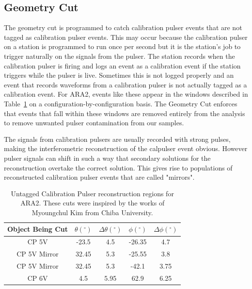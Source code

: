   \subsection{Geometry Cut}
  
    The geometry cut is programmed to catch calibration pulser events that are not tagged as calibration pulser events. 
    This may occur because the calibration pulser on a station is programmed to run once per second but it is the station's job to trigger naturally on the signals from the pulser. %
    The station records when the calibration pulser is firing and logs an event as a calibration event if the station triggers while the pulser is live. 
    Sometimes this is not logged properly and an event that records waveforms from a calibration pulser is not actually tagged as a calibration event. 
    For ARA2, events like these appear in the windows described in Table~\ref{tab:A2GC} on a configuration-by-configuration basis.
    The Geometry Cut enforces that events that fall within these windows are removed entirely from the analysis to remove unwanted pulser contamination from our samples.  
    
    The signals from calibration pulsers are usually recorded with strong pulses, making the interferometric reconstruction of the calpulser event obvious. 
    However pulser signals can shift in such a way that secondary solutions for the reconstruction overtake the correct solution. 
    This gives rise to populations of reconstructed calibration pulser events that are called "mirrors". 
    
    \begin{table}
      \centering
      \begin{tabular}{ | c | c c | c c |}
        \hline
        Object Being Cut & $\theta (^{\circ})$ & $\Delta\theta (^{\circ})$ & $\phi (^{\circ})$ & $\Delta\phi (^{\circ})$ \\
        \hline
        CP 5V & -23.5 & 4.5 & -26.35 & 4.7 \\
        CP 5V Mirror #1 & 32.45 & 5.3 & -25.55 & 3.8 \\
        CP 5V Mirror #2 & 32.45 & 5.3 & -42.1 & 3.75 \\
        CP 6V & 4.5 & 5.95 & 62.9 & 6.25 \\
        \hline
      \end{tabular}
      \caption{Untagged Calibration Pulser reconstruction regions for ARA2. These cuts were inspired by the works of Myoungchul Kim from Chiba University.}
      \label{tab:A2GC}
    \end{table}

